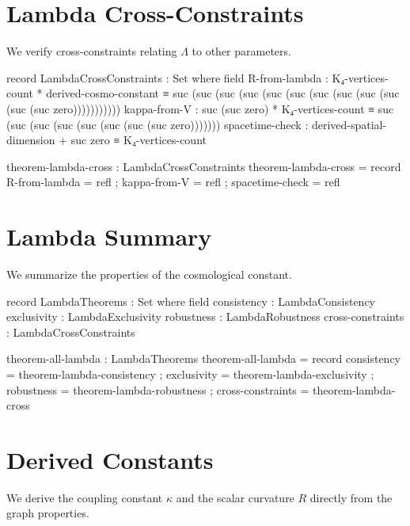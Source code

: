\documentclass[11pt,a4paper]{book}
\begin{document}
\section{Lambda Cross-Constraints}

We verify cross-constraints relating $\Lambda$ to other parameters.

\begin{code}
record LambdaCrossConstraints : Set where
  field
    R-from-lambda      : K₄-vertices-count * derived-cosmo-constant ≡ suc (suc (suc (suc (suc (suc (suc (suc (suc (suc (suc (suc zero)))))))))))
    kappa-from-V       : suc (suc zero) * K₄-vertices-count ≡ suc (suc (suc (suc (suc (suc (suc (suc zero)))))))
    spacetime-check    : derived-spatial-dimension + suc zero ≡ K₄-vertices-count

theorem-lambda-cross : LambdaCrossConstraints
theorem-lambda-cross = record
  { R-from-lambda      = refl
  ; kappa-from-V       = refl
  ; spacetime-check    = refl
  }
\end{code}

\section{Lambda Summary}

We summarize the properties of the cosmological constant.

\begin{code}
record LambdaTheorems : Set where
  field
    consistency       : LambdaConsistency
    exclusivity       : LambdaExclusivity
    robustness        : LambdaRobustness
    cross-constraints : LambdaCrossConstraints

theorem-all-lambda : LambdaTheorems
theorem-all-lambda = record
  { consistency       = theorem-lambda-consistency
  ; exclusivity       = theorem-lambda-exclusivity
  ; robustness        = theorem-lambda-robustness
  ; cross-constraints = theorem-lambda-cross
  }
\end{code}

\section{Derived Constants}

We derive the coupling constant $\kappa$ and the scalar curvature $R$ directly from the graph properties.
\end{document}
